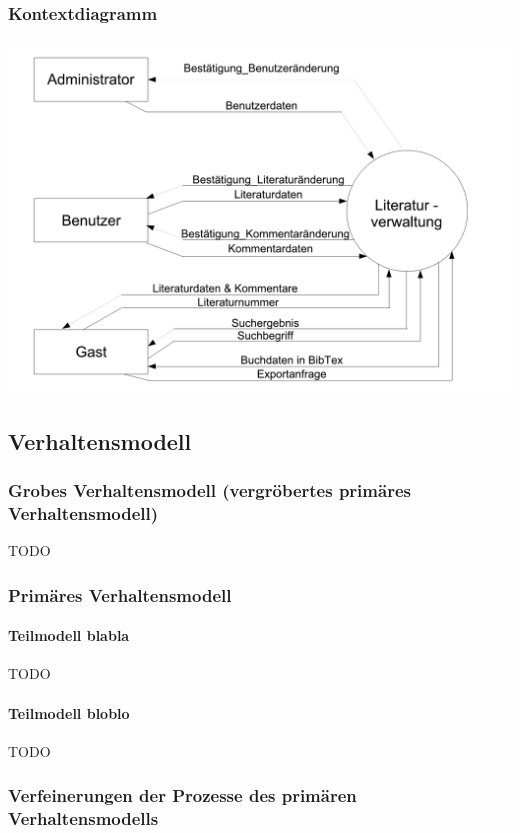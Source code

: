 \subsubsection{Kontextdiagramm}

\centerline{\includegraphics[scale=0.5]{kontextdiagramm}}

\subsection{Verhaltensmodell}
\subsubsection{Grobes Verhaltensmodell (vergröbertes primäres Verhaltensmodell)}
TODO

\subsubsection{Primäres Verhaltensmodell}
\paragraph{Teilmodell blabla}
TODO

\paragraph{Teilmodell bloblo}
TODO

\subsubsection{Verfeinerungen der Prozesse des primären Verhaltensmodells}

